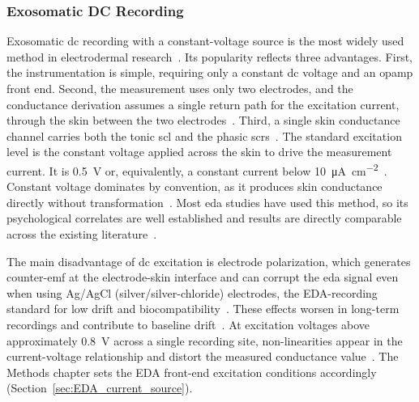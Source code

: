 \subsubsection{Exosomatic DC Recording} \label{sec:EDA_DC}
Exosomatic \gls{dc} recording with a constant-voltage source is the most widely used method in electrodermal research~\cite{boucsein_electrodermal_2012, posada-quintero_innovations_2020}. Its popularity reflects three advantages. First, the instrumentation is simple, requiring only a constant \gls{dc} voltage and an \gls{opamp} front end. Second, the measurement uses only two electrodes, and the conductance derivation assumes a single return path for the excitation current, through the skin between the two electrodes~\cite{boucsein_electrodermal_2012}. Third, a single skin conductance channel carries both the tonic \gls{scl} and the phasic \glspl{scr}~\cite{gersak_electrodermal_2020, zangroniz_electrodermal_2017, tronstad_current_2022}. The standard excitation level is the constant voltage applied across the skin to drive the measurement current. It is \qty{0.5}{\volt} or, equivalently, a constant current below \SI{10}{\micro\ampere\per\centi\meter\squared}~\cite{boucsein_electrodermal_2012}. Constant voltage dominates by convention, as it produces skin conductance directly without transformation~\cite{boucsein_electrodermal_2012}. Most \gls{eda} studies have used this method, so its psychological correlates are well established and results are directly comparable across the existing literature~\cite{boucsein_electrodermal_2012, posada-quintero_innovations_2020}.

The main disadvantage of \gls{dc} excitation is electrode polarization, which generates counter-\gls{emf} at the electrode-skin interface and can corrupt the \gls{eda} signal even when using Ag/AgCl (silver/silver-chloride) electrodes, the EDA-recording standard for low drift and biocompatibility~\cite{posada-quintero_innovations_2020, boucsein_electrodermal_2012}. These effects worsen in long-term recordings and contribute to baseline drift~\cite{pabst_comparison_2017}. At excitation voltages above approximately \qty{0.8}{\volt} across a single recording site, non-linearities appear in the current-voltage relationship and distort the measured conductance value~\cite{pabst_comparison_2017, boucsein_electrodermal_2012}. The Methods chapter sets the EDA front-end excitation conditions accordingly (Section~\ref{sec:EDA_current_source}).

